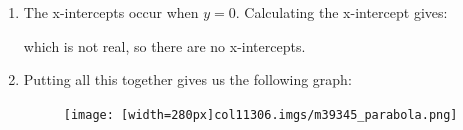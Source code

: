 {\begin{mdframed}[linewidth=4, leftmargin=40, rightmargin=40]
\begin{exercise}
\begin{enumerate}[noitemsep, label=\textbf{Step} \textbf{\arabic*}. ]
 \item The x-intercepts occur when \begin{math}y=0\end{math}. Calculating the x-intercept gives:
\label{m39345*id73445}\nopagebreak\noindent{}
    

which is not real, so there are no x-intercepts.\item Putting all this together gives us the following graph:

    \setcounter{subfigure}{0}


	\begin{figure}[H] %
    \begin{center}
    \label{m39345*uid12459!!!underscore!!!media}\label{m39345*uid12459!!!underscore!!!printimage}\texttt{[image: [width=280px]col11306.imgs/m39345\_parabola.png]} %
        

\end{center}
\end{figure}
\end{enumerate}
\end{exercise}
\end{mdframed}}
